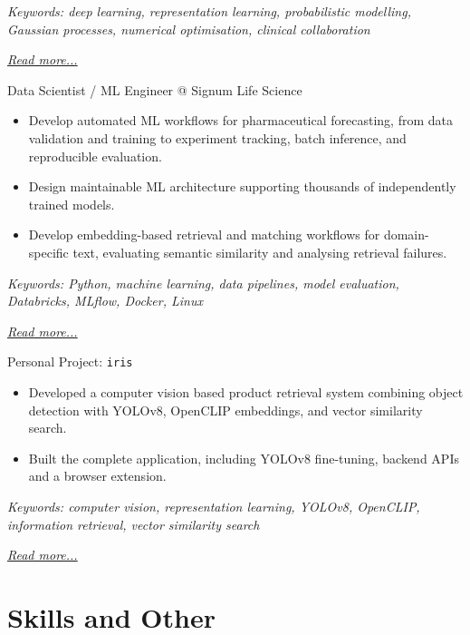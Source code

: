 \documentclass[11pt,a4paper]{moderncv}
\begin{document}
{\footnotesize\textit{Keywords: deep learning, representation learning, probabilistic modelling, Gaussian processes, numerical optimisation, clinical collaboration}}

\hfill{\small{\textit{\hyperref[sec:raysearch]{Read more...}}}}

\large{Data Scientist / ML Engineer @ Signum Life Science}
\normalsize
\begin{itemize}
    \item Develop automated ML workflows for pharmaceutical forecasting, from data validation and training to experiment tracking, batch inference, and reproducible evaluation.
    \item Design maintainable ML architecture supporting thousands of independently trained models.
    \item Develop embedding-based retrieval and matching workflows for domain-specific text, evaluating semantic similarity and analysing retrieval failures.

\end{itemize}

{\footnotesize\textit{Keywords: Python, machine learning, data pipelines, model evaluation, Databricks, MLflow, Docker, Linux}}

\hfill{\small{\textit{\hyperref[sec:signum]{Read more...}}}}

\large{Personal Project: \texttt{iris}}
\normalsize
\begin{itemize}
    \item Developed a computer vision based product retrieval system combining object detection with YOLOv8, OpenCLIP embeddings, and vector similarity search. 
    \item Built the complete application, including YOLOv8 fine-tuning, backend APIs and a browser extension.
\end{itemize}

{\footnotesize\textit{Keywords: computer vision, representation learning, YOLOv8, OpenCLIP, information retrieval, vector similarity search}}

\hfill{\small{\textit{\hyperref[sec:iris]{Read more...}}}}


\section{Skills and Other}
\end{document}
